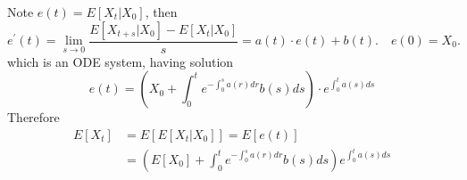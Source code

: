 \documentclass{ctexart}
\begin{document}
Note  $e(t)=E\left[X_{t} | X_{0}\right]$, then
\begin{equation}
    e^{\prime}(t)=\lim _{s \rightarrow 0} \frac{E\left[X_{t+s} | X_{0}\right]-E\left[X_{t} | X_{0}\right]}{s}=a(t) \cdot e(t)+b(t) . \quad e(0)=X_{0} .    
\end{equation}
which is an ODE system, having solution
\begin{equation}
    e(t)=\left(X_{0}+\int_{0}^{t} e^{-\int_{0}^{s} a(r) d r} b(s) d s\right) \cdot e^{\int_{0}^{t} a(s) d s}
\end{equation}
Therefore
\begin{equation}
    \begin{aligned}
    E\left[X_{t}\right] & =E\left[E\left[X_{t} | X_{0}\right]\right]=E[e(t)] \\
    & =\left(E\left[X_{0}\right]+\int_{0}^{t} e^{-\int_{0}^{s} a(r) d r} b(s) d s\right) e^{\int_{0}^{t} a(s) d s}
    \end{aligned}
\end{equation}
\end{document}
